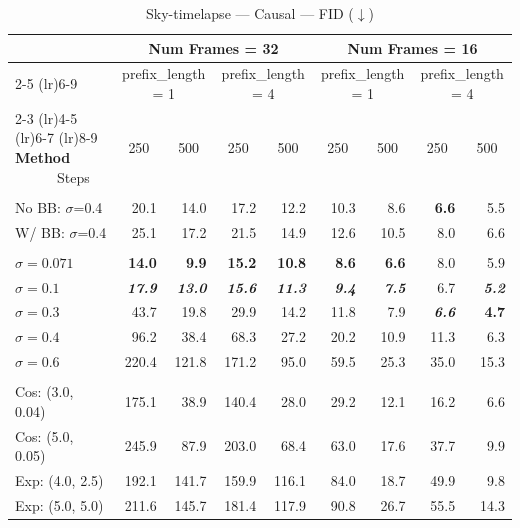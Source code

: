 \begin{table}[h]
\centering\tiny
\caption{Sky-timelapse --- Causal --- FID ($\downarrow$)}
\label{tab:sky_causal_rollout_fid}
\begin{tabular}{lrrrrrrrr}
\toprule
 & \multicolumn{4}{c}{Num Frames = 32} & \multicolumn{4}{c}{Num Frames = 16} \\
\cmidrule(lr){2-5} \cmidrule(lr){6-9}
 & \multicolumn{2}{c}{prefix\_length = 1} & \multicolumn{2}{c}{prefix\_length = 4} & \multicolumn{2}{c}{prefix\_length = 1} & \multicolumn{2}{c}{prefix\_length = 4} \\
\cmidrule(lr){2-3} \cmidrule(lr){4-5} \cmidrule(lr){6-7} \cmidrule(lr){8-9}
\textbf{Method} \ \ \ \ \ \ Steps & \multicolumn{1}{c}{250} & \multicolumn{1}{c}{500} & \multicolumn{1}{c}{250} & \multicolumn{1}{c}{500} & \multicolumn{1}{c}{250} & \multicolumn{1}{c}{500} & \multicolumn{1}{c}{250} & \multicolumn{1}{c}{500} \\
\midrule
\rowcolor{gray!20} \multicolumn{9}{l}{\textit{ABC}} \\
\quad No BB: $\sigma$=0.4 & 20.1 & 14.0 & 17.2 & 12.2 & 10.3 & 8.6 & \textbf{6.6} & 5.5 \\
\quad W/ BB: $\sigma$=0.4 & 25.1 & 17.2 & 21.5 & 14.9 & 12.6 & 10.5 & 8.0 & 6.6 \\
\rowcolor{gray!20} \multicolumn{9}{l}{\textit{Conditional Diffusion Bridge}} \\
\quad $\sigma=0.071$ & \textbf{14.0} & \textbf{9.9} & \textbf{15.2} & \textbf{10.8} & \textbf{8.6} & \textbf{6.6} & 8.0 & 5.9 \\
\quad $\sigma=0.1$ & \textbf{\textit{17.9}} & \textbf{\textit{13.0}} & \textbf{\textit{15.6}} & \textbf{\textit{11.3}} & \textbf{\textit{9.4}} & \textbf{\textit{7.5}} & 6.7 & \textbf{\textit{5.2}} \\
\quad $\sigma=0.3$ & 43.7 & 19.8 & 29.9 & 14.2 & 11.8 & 7.9 & \textbf{\textit{6.6}} & \textbf{4.7} \\
\quad $\sigma=0.4$ & 96.2 & 38.4 & 68.3 & 27.2 & 20.2 & 10.9 & 11.3 & 6.3 \\
\quad $\sigma=0.6$ & 220.4 & 121.8 & 171.2 & 95.0 & 59.5 & 25.3 & 35.0 & 15.3 \\
\rowcolor{gray!20} \multicolumn{9}{l}{\textit{Noise-to-Data Diffusion}} \\
\quad Cos: (3.0, 0.04) & 175.1 & 38.9 & 140.4 & 28.0 & 29.2 & 12.1 & 16.2 & 6.6 \\
\quad Cos: (5.0, 0.05) & 245.9 & 87.9 & 203.0 & 68.4 & 63.0 & 17.6 & 37.7 & 9.9 \\
\quad Exp: (4.0, 2.5) & 192.1 & 141.7 & 159.9 & 116.1 & 84.0 & 18.7 & 49.9 & 9.8 \\
\quad Exp: (5.0, 5.0) & 211.6 & 145.7 & 181.4 & 117.9 & 90.8 & 26.7 & 55.5 & 14.3 \\
\bottomrule
\end{tabular}
\end{table}

